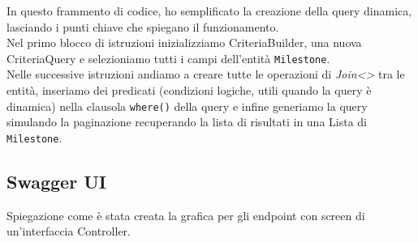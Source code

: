 \noindent In questo frammento di codice, ho semplificato la creazione della query dinamica, lasciando i punti chiave che spiegano il funzionamento.\\
Nel primo blocco di istruzioni inizializziamo CriteriaBuilder, una nuova CriteriaQuery e selezioniamo tutti i campi dell'entità \texttt{Milestone}.\\
Nelle successive istruzioni andiamo a creare tutte le operazioni di \textit{Join<>} tra le entità, inseriamo dei predicati (condizioni logiche, utili quando la query è dinamica) nella clausola \texttt{where()} della query e infine generiamo la query simulando la paginazione recuperando la lista di risultati in una Lista di \texttt{Milestone}.


\subsection{Swagger UI}
Spiegazione come è stata creata la grafica per gli endpoint con screen di un'interfaccia Controller.